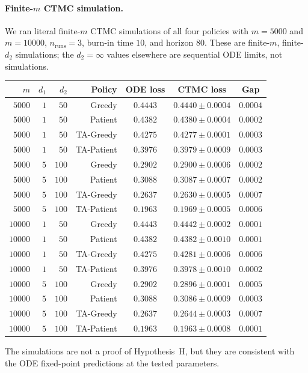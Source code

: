 \documentclass{article}
\theoremstyle{plain}
\theoremstyle{definition}
\begin{document}
\paragraph{Finite-$m$ CTMC simulation.}
We ran literal finite-$m$ CTMC simulations of all four policies with $m=5000$ and $m=10000$, $n_{\mathrm{runs}}=3$, burn-in time $10$, and horizon $80$. These are finite-$m$, finite-$d_2$ simulations; the $d_2=\infty$ values elsewhere are sequential ODE limits, not simulations.
\begin{center}
{\small
\begin{tabular}{rrr|r|ccc}
$m$ & $d_1$ & $d_2$ & Policy & ODE loss & CTMC loss & Gap\\\hline
$5000$  & $1$ & $50$  & Greedy     & $0.4443$ & $0.4440\pm0.0004$ & $0.0004$\\
$5000$  & $1$ & $50$  & Patient    & $0.4382$ & $0.4380\pm0.0004$ & $0.0002$\\
$5000$  & $1$ & $50$  & TA-Greedy  & $0.4275$ & $0.4277\pm0.0001$ & $0.0003$\\
$5000$  & $1$ & $50$  & TA-Patient & $0.3976$ & $0.3979\pm0.0009$ & $0.0003$\\
$5000$  & $5$ & $100$ & Greedy     & $0.2902$ & $0.2900\pm0.0006$ & $0.0002$\\
$5000$  & $5$ & $100$ & Patient    & $0.3088$ & $0.3087\pm0.0007$ & $0.0002$\\
$5000$  & $5$ & $100$ & TA-Greedy  & $0.2637$ & $0.2630\pm0.0005$ & $0.0007$\\
$5000$  & $5$ & $100$ & TA-Patient & $0.1963$ & $0.1969\pm0.0005$ & $0.0006$\\
$10000$ & $1$ & $50$  & Greedy     & $0.4443$ & $0.4442\pm0.0002$ & $0.0001$\\
$10000$ & $1$ & $50$  & Patient    & $0.4382$ & $0.4382\pm0.0010$ & $0.0001$\\
$10000$ & $1$ & $50$  & TA-Greedy  & $0.4275$ & $0.4281\pm0.0006$ & $0.0006$\\
$10000$ & $1$ & $50$  & TA-Patient & $0.3976$ & $0.3978\pm0.0010$ & $0.0002$\\
$10000$ & $5$ & $100$ & Greedy     & $0.2902$ & $0.2896\pm0.0001$ & $0.0005$\\
$10000$ & $5$ & $100$ & Patient    & $0.3088$ & $0.3086\pm0.0009$ & $0.0003$\\
$10000$ & $5$ & $100$ & TA-Greedy  & $0.2637$ & $0.2644\pm0.0003$ & $0.0007$\\
$10000$ & $5$ & $100$ & TA-Patient & $0.1963$ & $0.1963\pm0.0008$ & $0.0001$
\end{tabular}
}
\end{center}
The simulations are not a proof of Hypothesis~H, but they are consistent with the ODE fixed-point predictions at the tested parameters.
\end{document}
